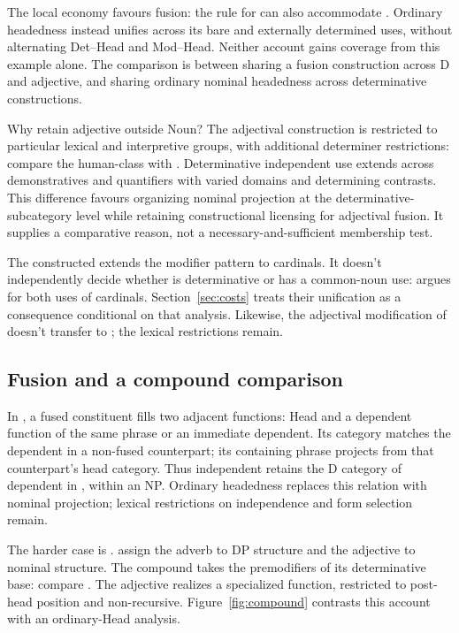 \documentclass[12pt]{article}
\begin{document}
The local economy favours fusion: the rule for  can also accommodate . Ordinary headedness instead unifies  across its bare and externally determined uses, without alternating Det--Head and Mod--Head. Neither account gains coverage from this example alone. The comparison is between sharing a fusion construction across D and adjective, and sharing ordinary nominal headedness across determinative constructions.

Why retain adjective outside Noun? The adjectival construction is restricted to particular lexical and interpretive groups, with additional determiner restrictions: compare the human-class  with  \citep[416--417]{huddleston2002}. Determinative independent use extends across demonstratives and quantifiers with varied domains and determining contrasts. This difference favours organizing nominal projection at the determinative-subcategory level while retaining constructional licensing for adjectival fusion. It supplies a comparative reason, not a necessary-and-sufficient membership test.

The constructed  extends the modifier pattern to cardinals. It doesn't independently decide whether  is determinative or has a common-noun use: \textcite{reynolds2026numerals} argues for both uses of cardinals. Section~\ref{sec:costs} treats their unification as a consequence conditional on that analysis. Likewise, the adjectival modification of  doesn't transfer to ; the lexical restrictions remain.

\subsection{Fusion and a compound comparison}\label{sec:compounds}

In \textcite{Payne2007}, a fused constituent fills two adjacent functions: Head and a dependent function of the same phrase or an immediate dependent. Its category matches the dependent in a non-fused counterpart; its containing phrase projects from that counterpart's head category. Thus independent  retains the D category of dependent  in , within an NP. Ordinary headedness replaces this relation with nominal projection; lexical restrictions on independence and form selection remain.

The harder case is . \textcite[581--583]{Payne2007} assign the adverb to DP structure and the adjective to nominal structure. The compound takes the premodifiers of its determinative base: compare . The adjective realizes a specialized  function, restricted to post-head position and non-recursive. Figure~\ref{fig:compound} contrasts this account with an ordinary-Head analysis.
\end{document}
